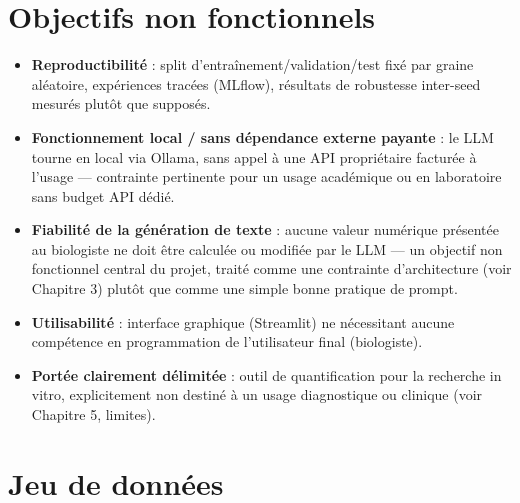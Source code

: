 \documentclass[12pt,a4paper]{report}
\begin{document}
\section{Objectifs non fonctionnels}

\begin{itemize}
\item \textbf{Reproductibilité} : split d'entraînement/validation/test fixé par graine aléatoire, expériences tracées (MLflow), résultats de robustesse inter-seed mesurés plutôt que supposés.
\item \textbf{Fonctionnement local / sans dépendance externe payante} : le LLM tourne en local via Ollama, sans appel à une API propriétaire facturée à l'usage — contrainte pertinente pour un usage académique ou en laboratoire sans budget API dédié.
\item \textbf{Fiabilité de la génération de texte} : aucune valeur numérique présentée au biologiste ne doit être calculée ou modifiée par le LLM — un objectif non fonctionnel central du projet, traité comme une contrainte d'architecture (voir Chapitre 3) plutôt que comme une simple bonne pratique de prompt.
\item \textbf{Utilisabilité} : interface graphique (Streamlit) ne nécessitant aucune compétence en programmation de l'utilisateur final (biologiste).
\item \textbf{Portée clairement délimitée} : outil de quantification pour la recherche in vitro, explicitement non destiné à un usage diagnostique ou clinique (voir Chapitre 5, limites).
\end{itemize}

\section{Jeu de données}
\end{document}
